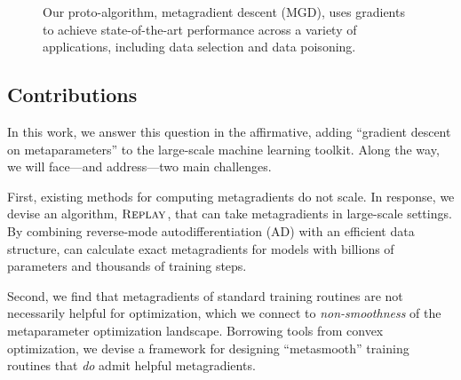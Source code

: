 \begin{figure}
  \centering
  
  \caption{Our proto-algorithm, metagradient descent (MGD),
    uses gradients to achieve state-of-the-art performance across
    a variety of applications, including data selection and
  data poisoning.}
  \label{fig:headline}
\end{figure}

\subsection{Contributions}
In this work,
we answer this question in the affirmative,
adding ``gradient descent on metaparameters''
to the large-scale machine learning toolkit.
Along the way, we will face---and address---two main challenges.

First, existing methods for computing metagradients do not scale.
In response, we devise an algorithm, $\textsc{Replay}{}$,
that can take
metagradients in large-scale settings.
By combining reverse-mode autodifferentiation (AD)
with an efficient data structure,
\replay{} can calculate exact metagradients for models
with billions of parameters and thousands of training steps.

Second,
we find that metagradients of standard training routines
are not necessarily helpful for optimization,
which we connect to {\em non-smoothness} of the metaparameter
optimization landscape.
Borrowing tools from convex optimization,
we devise a framework for designing
``metasmooth'' training routines that {\em do} admit helpful
metagradients.

